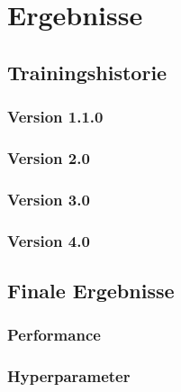 \section{Ergebnisse}
\subsection{Trainingshistorie}
\subsubsection{Version 1.1.0}
\subsubsection{Version 2.0}
\subsubsection{Version 3.0}
\subsubsection{Version 4.0}
\subsection{Finale Ergebnisse}
\subsubsection{Performance}
\subsubsection{Hyperparameter}
